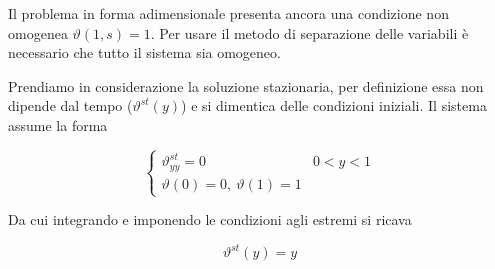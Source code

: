 Il problema in forma adimensionale presenta ancora una condizione non omogenea $\displaystyle \vartheta(1,s) =1$. Per usare il metodo di separazione delle variabili è necessario che tutto il sistema sia omogeneo.

Prendiamo in considerazione la soluzione stazionaria, per definizione essa non dipende dal tempo ($\vartheta^{st}(y)$) e si dimentica delle condizioni iniziali. Il sistema assume la forma

\begin{equation*}
    \begin{cases}
        \vartheta_{yy}^{st} =0            & 0< y< 1 \\
        \vartheta(0) =0,\ \vartheta(1) =1 &
    \end{cases}
\end{equation*}

Da cui integrando e imponendo le condizioni agli estremi si ricava

\begin{equation*}
    \vartheta^{st}(y) =y
\end{equation*}

